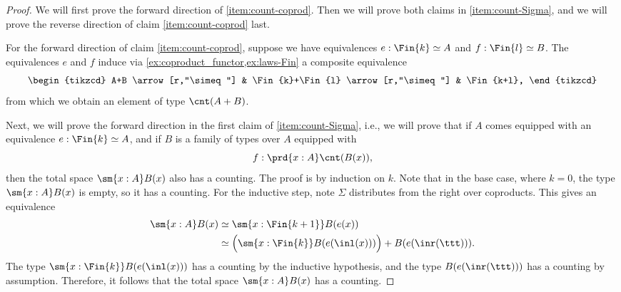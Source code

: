 \begin{proof}
  We will first prove the forward direction of \ref{item:count-coprod}. Then we will prove both claims in \ref{item:count-Sigma}, and we will prove the reverse direction of claim \ref{item:count-coprod} last.

  For the forward direction of claim \ref{item:count-coprod}, suppose we have equivalences $e:\Fin{k}\simeq A$ and $f:\Fin{l}\simeq B$. The equivalences $e$ and $f$ induce via \cref{ex:coproduct_functor,ex:laws-Fin} a composite equivalence
  \begin{equation*}
    \begin{tikzcd}
      A+B \arrow[r,"\simeq"] & \Fin{k}+\Fin{l} \arrow[r,"\simeq"] & \Fin{k+l},
    \end{tikzcd}
  \end{equation*}
  from which we obtain an element of type $\cnt(A+B)$.

  Next, we will prove the forward direction in the first claim of \ref{item:count-Sigma}, i.e., we will prove that if $A$ comes equipped with an equivalence $e:\Fin{k}\simeq A$, and if $B$ is a family of types over $A$ equipped with
  \begin{equation*}
    f:\prd{x:A}\cnt(B(x)),
  \end{equation*}
  then the total space $\sm{x:A}B(x)$ also has a counting. The proof is by induction on $k$. Note that in the base case, where $k=0$, the type $\sm{x:A}B(x)$ is empty, so it has a counting. For the inductive step, note $\Sigma$ distributes from the right over coproducts. This gives an equivalence
  \begin{align*}
    \sm{x:A}B(x) & \simeq \sm{x:\Fin{k+1}}B(e(x)) \\
    & \simeq \Big(\sm{x:\Fin{k}}B(e(\inl(x)))\Big)+ B(e(\inr(\ttt))).
  \end{align*}
  The type $\sm{x:\Fin{k}}B(e(\inl(x)))$ has a counting by the inductive hypothesis, and the type $B(e(\inr(\ttt)))$ has a counting by assumption. Therefore, it follows that the total space $\sm{x:A}B(x)$ has a counting.
  

\end{proof}
